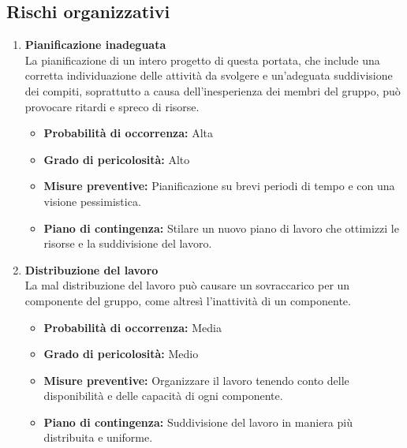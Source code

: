\subsection{Rischi organizzativi}
\begin{enumerate}
    \item \textbf{Pianificazione inadeguata}\\
    La pianificazione di un intero progetto di questa portata, che include una corretta individuazione delle attività da svolgere e un'adeguata suddivisione dei compiti, soprattutto a causa dell'inesperienza dei membri del gruppo, può provocare ritardi e spreco di risorse.
    \begin{itemize}
        \item \textbf{Probabilità di occorrenza:} Alta
        \item \textbf{Grado di pericolosità:} Alto
        \item \textbf{Misure preventive:} Pianificazione su brevi periodi di tempo e con una visione pessimistica.
        \item \textbf{Piano di contingenza:} Stilare un nuovo piano di lavoro che ottimizzi le risorse e la suddivisione del lavoro.
    \end{itemize}

\item \textbf{Distribuzione del lavoro}\\
    La mal distribuzione del lavoro può causare un sovraccarico per un componente del gruppo, come altresì l'inattività di un componente.
    \begin{itemize}
        \item \textbf{Probabilità di occorrenza:} Media
        \item \textbf{Grado di pericolosità:} Medio
        \item \textbf{Misure preventive:} Organizzare il lavoro tenendo conto delle disponibilità e delle capacità di ogni componente.
        \item \textbf{Piano di contingenza:} Suddivisione del lavoro in maniera più distribuita e uniforme.
    \end{itemize}
    
\end{enumerate}

